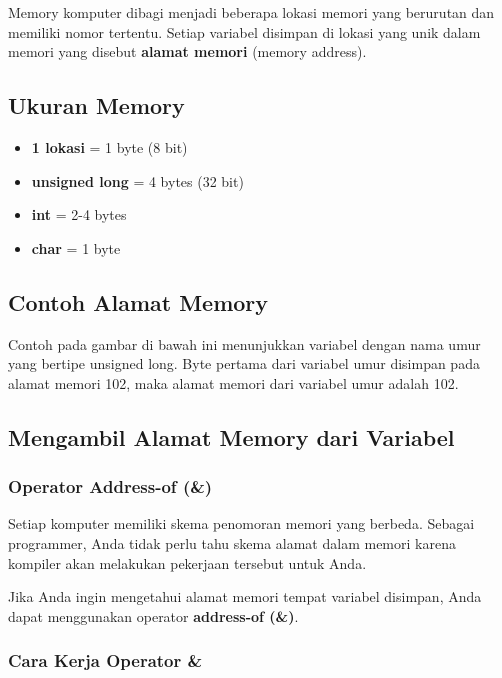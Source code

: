 Memory komputer dibagi menjadi beberapa lokasi memori yang berurutan dan memiliki nomor tertentu. Setiap variabel disimpan di lokasi yang unik dalam memori yang disebut \textbf{alamat memori} (memory address).

\subsection{Ukuran Memory}

\begin{itemize}
\item \textbf{1 lokasi} = 1 byte (8 bit)
\item \textbf{unsigned long} = 4 bytes (32 bit)
\item \textbf{int} = 2-4 bytes
\item \textbf{char} = 1 byte
\end{itemize}

\subsection{Contoh Alamat Memory}

Contoh pada gambar di bawah ini menunjukkan variabel dengan nama umur yang bertipe unsigned long. Byte pertama dari variabel umur disimpan pada alamat memori 102, maka alamat memori dari variabel umur adalah 102.

\subsection{Mengambil Alamat Memory dari Variabel}\label{mengambil-alamat-memory-dari-variabel}

\subsubsection{Operator Address-of (\&)}

Setiap komputer memiliki skema penomoran memori yang berbeda. Sebagai programmer, Anda tidak perlu tahu skema alamat dalam memori karena kompiler akan melakukan pekerjaan tersebut untuk Anda.

Jika Anda ingin mengetahui alamat memori tempat variabel disimpan, Anda dapat menggunakan operator \textbf{address-of (\&)}.

\subsubsection{Cara Kerja Operator \&}

